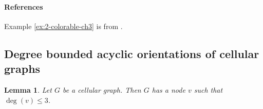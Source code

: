 \documentclass[a4paper, 12pt]{article}
\newtheorem{lem}{Lemma}[section]
\begin{document}
\paragraph*{References} Example \ref{ex:2-colorable-ch3} is from \cite{erdos-choosability}.
\subsection{Degree bounded acyclic orientations of cellular graphs}\label{sec:orientation}



\begin{lem}\label{lem:degree-constraint}
Let $G$ be a cellular graph. Then $G$ has a node $v$ such that $\deg(v) \leqslant 3$.
\end{lem}
\end{document}
